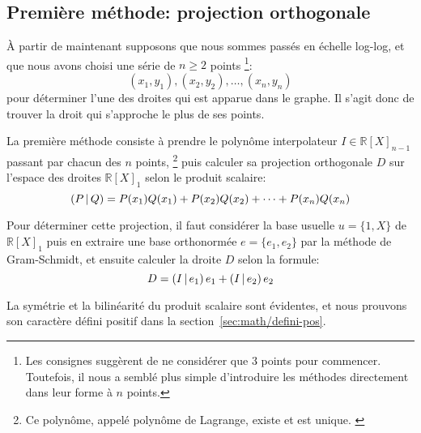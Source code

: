 \subsection{Première méthode: projection orthogonale}

À partir de maintenant supposons que nous sommes passés en échelle log-log,
et que nous avons choisi une série de $n\geq 2$ points%
\footnote{
    Les consignes suggèrent de ne considérer que 3 points pour commencer.
    Toutefois, il nous a semblé plus simple d'introduire les méthodes
    directement dans leur forme à $n$ points.
}:
\[
    (x_1,y_1),(x_2,y_2),\ldots,(x_n,y_n)
\]
pour déterminer l'une des droites qui est apparue dans le graphe.
Il s'agit donc de trouver la droit qui s'approche le plus de ses points.

La première méthode consiste à prendre le polynôme interpolateur
$I \in \mathbb{R}[X]_{n-1}$ passant par chacun des $n$ points,%
\footnote{
    Ce polynôme, appelé polynôme de Lagrange, existe et est unique.%
    \cite{lagrange-poly}
}
puis calculer sa projection orthogonale $D$
sur l'espace des droites $\mathbb{R}[X]_1$
selon le produit scalaire:
\begin{equation}
    \left(P\,\middle|\,Q\right) = P(x_1)Q(x_1) + P(x_2)Q(x_2) + \cdots + P(x_n)Q(x_n)
\end{equation}

Pour déterminer cette projection, il faut considérer la base usuelle
$u=\{1,X\}$ de $\mathbb{R}[X]_1$
puis en extraire une base orthonormée $e=\{e_1,e_2\}$ par la méthode
de Gram-Schmidt, et ensuite calculer la droite $D$
selon la formule:
\begin{equation}
    \label{eq:proj-ortho-I}
    D = \left(I\,\middle|\,e_1\right)e_1 + \left(I\,\middle|\,e_2\right)e_2
\end{equation}

La symétrie et la bilinéarité du produit scalaire sont évidentes,
et nous prouvons son caractère défini positif dans
la section~\ref{sec:math/defini-pos}.
